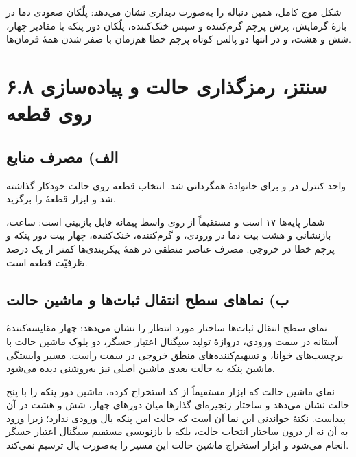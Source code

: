 \documentclass[12pt,a4paper]{article}
\begin{document}
	شکل موج کامل، همین دنباله را به‌صورت دیداری نشان می‌دهد: پلّکان صعودی دما در بازهٔ گرمایش، پرش پرچم گرم‌کننده و سپس خنک‌کننده، پلّکان دور پنکه با مقادیر چهار، شش و هشت، و در انتها دو پالس کوتاه پرچم خطا هم‌زمان با صفر شدن همهٔ فرمان‌ها.


	\section*{۶.۸ سنتز، رمزگذاری حالت و پیاده‌سازی روی قطعه}
	\subsection*{الف) مصرف منابع}
	واحد کنترل در  و برای خانوادهٔ  همگردانی شد. انتخاب قطعه روی حالت خودکار گذاشته شد و ابزار قطعهٔ  را برگزید.



	شمار پایه‌ها ۱۷ است و مستقیماً از روی واسط پیمانه قابل بازبینی است: ساعت، بازنشانی و هشت بیت دما در ورودی، و گرم‌کننده، خنک‌کننده، چهار بیت دور پنکه و پرچم خطا در خروجی. مصرف عناصر منطقی در همهٔ پیکربندی‌ها کمتر از یک درصد ظرفیّت قطعه است.

	\subsection*{ب) نماهای سطح انتقال ثبات‌ها و ماشین حالت}
	نمای سطح انتقال ثبات‌ها ساختار مورد انتظار را نشان می‌دهد: چهار مقایسه‌کنندهٔ آستانه در سمت ورودی، دروازهٔ تولید سیگنال اعتبار حسگر، دو بلوک ماشین حالت با برچسب‌های خوانا، و تسهیم‌کننده‌های منطق خروجی در سمت راست. مسیر وابستگی ماشین پنکه به حالت بعدی ماشین اصلی نیز به‌روشنی دیده می‌شود.


	نمای ماشین حالت که ابزار مستقیماً از کد استخراج کرده، ماشین دور پنکه را با پنج حالت نشان می‌دهد و ساختار زنجیره‌ای گذارها میان دورهای چهار، شش و هشت در آن پیداست. نکتهٔ خواندنی این نما آن است که حالت امن پنکه یال ورودی ندارد؛ زیرا ورود به آن نه از درون ساختار انتخاب حالت، بلکه با بازنویسی مستقیم سیگنال اعتبار حسگر انجام می‌شود و ابزار استخراج ماشین حالت این مسیر را به‌صورت یال ترسیم نمی‌کند.
\end{document}
